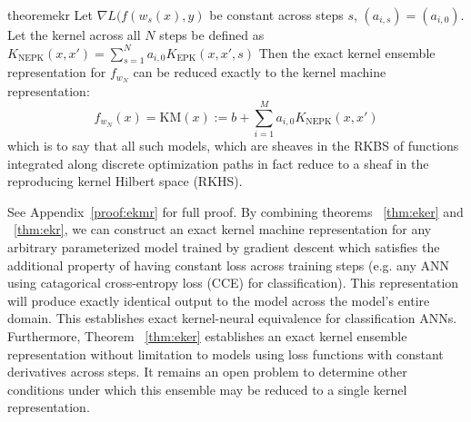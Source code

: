 \begin{restatable}{theorem}{ekr}
\label{thm:ekr}
Let $\nabla L(f(w_{s}(x), y)$ be constant  across steps $s$, $(a_{i,s}) = (a_{i,0})$. Let the kernel across all $N$ steps be defined as $K_{\text{NEPK}}(x,x') = \sum_{s = 1}^N a_{i,0} K_{\text{EPK}}(x, x', s)$ Then the exact kernel ensemble representation for $f_{w_N}$ can be reduced exactly to the kernel machine representation:
\begin{equation}
f_{w_N}(x) = \text{KM}(x) := b + \sum_{i = 1}^{M} a_{i,0} K_{\text{NEPK}}(x,x')
\label{exact}
\end{equation}
which is to say that all such models, which are sheaves in the RKBS of
functions integrated along discrete optimization paths in fact reduce
to a sheaf in the reproducing kernel Hilbert space (RKHS). 
\end{restatable}
See Appendix~\ref{proof:ekmr} for full proof. By combining theorems ~\ref{thm:eker} and ~\ref{thm:ekr}, we can construct an exact kernel machine representation for any arbitrary parameterized model trained by gradient descent which satisfies the additional property of having constant loss across training steps (e.g. any ANN using catagorical cross-entropy loss (CCE) for classification). This representation will produce exactly identical output to the model across  the model's entire domain. This establishes exact kernel-neural equivalence for classification ANNs. Furthermore, Theorem ~\ref{thm:eker} establishes an exact kernel ensemble representation without limitation to models using loss functions with constant derivatives across steps. It remains an open problem to determine other conditions under which this ensemble may be reduced to a single kernel representation.  



